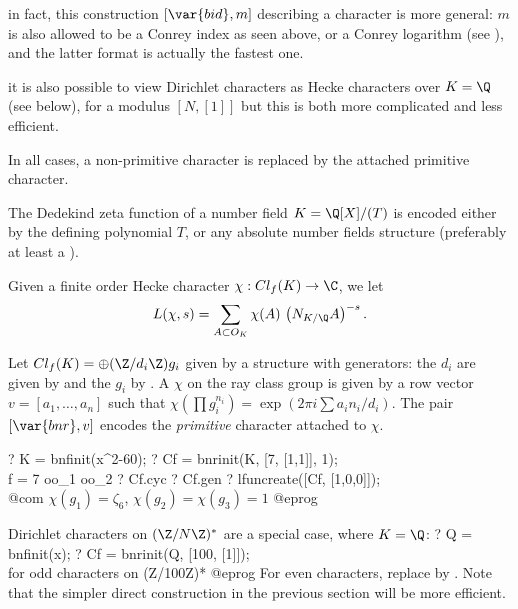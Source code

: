 \item in fact, this construction $[\var{bid}, m]$ describing a character
is more general: $m$ is also allowed to be a Conrey index as seen above,
or a Conrey logarithm (see ), and the latter format is
actually the fastest one.

\item it is also possible to view Dirichlet characters as Hecke characters
over $K = \Q$ (see below), for a modulus $[N, [1]]$ but this is both more
complicated and less efficient.

In all cases, a non-primitive character is replaced by the attached primitive
character.


The Dedekind zeta function of a number field $K = \Q[X]/(T)$ is encoded
either by the defining polynomial $T$, or any absolute number fields
structure (preferably at least a ).

Given a finite order Hecke character $\chi: Cl_f(K)\to \C$, we let
$$L(\chi, s) = \sum_{A \subset O_K} \chi(A)\, \left(N_{K/\Q}A\right)^{-s}.$$

Let $Cl_f(K) = \oplus (\Z/d_i\Z) g_i$ given by a  structure with
generators: the $d_i$ are given by  and the $g_i$ by .
A  $\chi$ on the ray class group is given by a row vector
$v = [a_1,\ldots,a_n]$ such that $\chi(\prod g_i^{n_i}) = \exp(2\pi i\sum
a_i n_i / d_i)$. The pair $[\var{bnr}, v]$ encodes the \emph{primitive}
character attached to $\chi$.

\bprog
? K  = bnfinit(x^2-60);
? Cf = bnrinit(K, [7, [1,1]], 1); \\ f = 7 oo_1 oo_2
? Cf.cyc
? Cf.gen
? lfuncreate([Cf, [1,0,0]]); \\@com $\chi(g_1) = \zeta_6$, $\chi(g_2)=\chi(g_3)=1$
@eprog

\noindent Dirichlet characters on $(\Z/N\Z)^*$ are a special case,
where $K = \Q$:
\bprog
? Q  = bnfinit(x);
? Cf = bnrinit(Q, [100, [1]]); \\ for odd characters on (Z/100Z)*
@eprog\noindent
For even characters, replace by . Note that the simpler
direct construction in the previous section will be more efficient.


